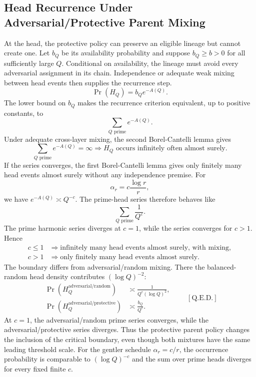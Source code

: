\subsection{Head Recurrence Under Adversarial/Protective Parent Mixing}
At the head, the protective policy can preserve an eligible lineage but cannot create one. Let $b_Q$ be its availability probability and suppose $b_Q\ge b > 0$ for all sufficiently large $Q$. Conditional on availability, the lineage must avoid every adversarial assignment in its chain. Independence or adequate weak mixing between head events then supplies the recurrence step.
\begin{equation*}
\Pr(H_Q)=b_Qe^{-A(Q)}.
\end{equation*}
The lower bound on $b_Q$ makes the recurrence criterion equivalent, up to positive constants, to
\begin{equation*}
\sum_{Q\text{ prime}}e^{-A(Q)}.
\end{equation*}
Under adequate cross-layer mixing, the second Borel-Cantelli lemma gives
\begin{equation*}
\sum_{Q\text{ prime}}e^{-A(Q)}=\infty
\Longrightarrow
H_Q\text{ occurs infinitely often almost surely}.
\end{equation*}
If the series converges, the first Borel-Cantelli lemma gives only finitely many head events almost surely without any independence premise.
For
\begin{equation*}
\alpha_r= c\frac{\log r}{r},
\end{equation*}
we have $e^{-A(Q)}\asymp Q^{-c}$. The prime-head series therefore behaves like
\begin{equation*}
\sum_{Q\text{ prime}}\frac1{Q^c}.
\end{equation*}
The prime harmonic series diverges at $c=1$, while the series converges for $c > 1$. Hence
\begin{equation*}
\begin{aligned}
c\le1
&\Longrightarrow
\text{infinitely many head events almost surely, with mixing},\\
c > 1
&\Longrightarrow
\text{only finitely many head events almost surely}.
\end{aligned}
\end{equation*}
The boundary differs from adversarial/random mixing. There the balanced-random head density contributes $(\log Q)^{-2}$:
\begin{equation*}
\begin{aligned}
\Pr(H_Q^{\mathrm{adversarial/random}})
&\asymp\frac1{Q^c(\log Q)^2},\\
\Pr(H_Q^{\mathrm{adversarial/protective}})
&\asymp\frac{b_Q}{Q^c}.
\end{aligned}
\qquad[\text{Q.E.D.}]
\end{equation*}
At $c=1$, the adversarial/random prime series converges, while the adversarial/protective series diverges. Thus the protective parent policy changes the inclusion of the critical boundary, even though both mixtures have the same leading threshold scale.
For the gentler schedule $\alpha_r= c/r$, the occurrence probability is comparable to $(\log Q)^{-c}$ and the sum over prime heads diverges for every fixed finite $c$.
